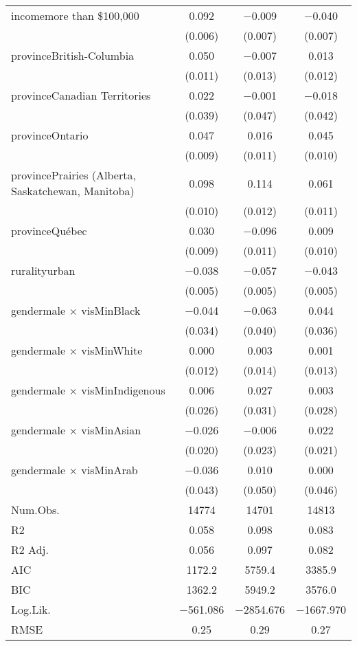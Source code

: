 \begin{table}
\begin{tabular}[t]{lccc}
incomemore than \$100,000 & \num{0.092} & \num{-0.009} & \num{-0.040}\\
 & (\num{0.006}) & (\num{0.007}) & (\num{0.007})\\
provinceBritish-Columbia & \num{0.050} & \num{-0.007} & \num{0.013}\\
 & (\num{0.011}) & (\num{0.013}) & (\num{0.012})\\
provinceCanadian Territories & \num{0.022} & \num{-0.001} & \num{-0.018}\\
 & (\num{0.039}) & (\num{0.047}) & (\num{0.042})\\
provinceOntario & \num{0.047} & \num{0.016} & \num{0.045}\\
 & (\num{0.009}) & (\num{0.011}) & \vphantom{1} (\num{0.010})\\
provincePrairies (Alberta, Saskatchewan, Manitoba) & \num{0.098} & \num{0.114} & \num{0.061}\\
 & (\num{0.010}) & (\num{0.012}) & (\num{0.011})\\
provinceQuébec & \num{0.030} & \num{-0.096} & \num{0.009}\\
 & (\num{0.009}) & (\num{0.011}) & (\num{0.010})\\
ruralityurban & \num{-0.038} & \num{-0.057} & \num{-0.043}\\
 & (\num{0.005}) & (\num{0.005}) & (\num{0.005})\\
gendermale × visMinBlack & \num{-0.044} & \num{-0.063} & \num{0.044}\\
 & (\num{0.034}) & (\num{0.040}) & (\num{0.036})\\
gendermale × visMinWhite & \num{0.000} & \num{0.003} & \num{0.001}\\
 & (\num{0.012}) & (\num{0.014}) & (\num{0.013})\\
gendermale × visMinIndigenous & \num{0.006} & \num{0.027} & \num{0.003}\\
 & (\num{0.026}) & (\num{0.031}) & (\num{0.028})\\
gendermale × visMinAsian & \num{-0.026} & \num{-0.006} & \num{0.022}\\
 & (\num{0.020}) & (\num{0.023}) & (\num{0.021})\\
gendermale × visMinArab & \num{-0.036} & \num{0.010} & \num{0.000}\\
 & (\num{0.043}) & (\num{0.050}) & (\num{0.046})\\
\midrule
Num.Obs. & \num{14774} & \num{14701} & \num{14813}\\
R2 & \num{0.058} & \num{0.098} & \num{0.083}\\
R2 Adj. & \num{0.056} & \num{0.097} & \num{0.082}\\
AIC & \num{1172.2} & \num{5759.4} & \num{3385.9}\\
BIC & \num{1362.2} & \num{5949.2} & \num{3576.0}\\
Log.Lik. & \num{-561.086} & \num{-2854.676} & \num{-1667.970}\\
RMSE & \num{0.25} & \num{0.29} & \num{0.27}\\
\bottomrule
\end{tabular}
\end{table}
